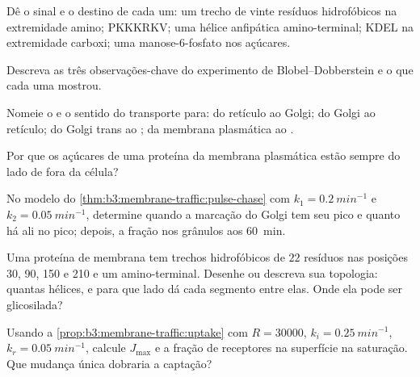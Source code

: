 \begin{exercise}[$\star$]\label{exo:b3:membrane-traffic:1}
Dê o sinal e o destino de cada um: um trecho de vinte resíduos
hidrofóbicos na extremidade amino; PKKKRKV; uma hélice anfipática
amino-terminal; KDEL na extremidade carboxi; uma manose-6-fosfato nos
açúcares.
\end{exercise}

\begin{exercise}[$\star$]\label{exo:b3:membrane-traffic:2}
Descreva as três observações-chave do experimento de
Blobel--Dobberstein e o que cada uma mostrou.
\end{exercise}

\begin{exercise}[$\star$]\label{exo:b3:membrane-traffic:3}
Nomeie o  e o sentido do transporte para: do retículo ao
Golgi; do Golgi ao retículo; do Golgi trans ao ; da membrana
plasmática ao .
\end{exercise}

\begin{exercise}[$\star$]\label{exo:b3:membrane-traffic:4}
Por que os açúcares de uma proteína da membrana plasmática estão sempre
do lado de fora da célula?
\end{exercise}

\begin{exercise}[$\star\star$]\label{exo:b3:membrane-traffic:5}
No modelo do \cref{thm:b3:membrane-traffic:pulse-chase} com
$k_{1}
= \qty{0.2}{min^{-1}}$ e $k_{2} = \qty{0.05}{min^{-1}}$,
determine quando a marcação do Golgi tem seu pico e quanto há ali no
pico; depois, a fração nos grânulos aos \qty{60}{min}.
\end{exercise}

\begin{exercise}[$\star\star$]\label{exo:b3:membrane-traffic:6}
Uma proteína de membrana tem trechos hidrofóbicos de $22$ resíduos nas
posições 30, 90, 150 e 210 e um  amino-terminal. Desenhe
ou descreva sua topologia: quantas hélices, e para que lado dá cada
segmento entre elas. Onde ela pode ser glicosilada?
\end{exercise}

\begin{exercise}[$\star\star$]\label{exo:b3:membrane-traffic:7}
Usando a \cref{prop:b3:membrane-traffic:uptake} com $R = \num{30000}$,
$k_{i} = \qty{0.25}{min^{-1}}$, $k_{r} = \qty{0.05}{min^{-1}}$, calcule
$J_{\max}$ e a fração de receptores na superfície na saturação. Que
mudança única dobraria a captação?
\end{exercise}

